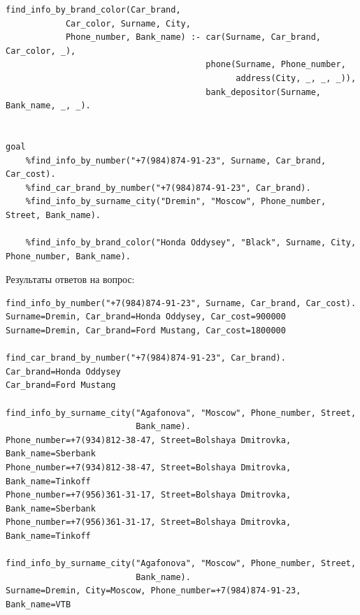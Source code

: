 \begin{lstlisting}[basicstyle=\footnotesize]
	find_info_by_brand_color(Car_brand, 
			Car_color, Surname, City, 
			Phone_number, Bank_name) :- car(Surname, Car_brand, Car_color, _),
										phone(Surname, Phone_number, 
											  address(City, _, _, _)), 
										bank_depositor(Surname, Bank_name, _, _).	 


goal
	%find_info_by_number("+7(984)874-91-23", Surname, Car_brand, Car_cost).
	%find_car_brand_by_number("+7(984)874-91-23", Car_brand).
	%find_info_by_surname_city("Dremin", "Moscow", Phone_number, Street, Bank_name).
	
	%find_info_by_brand_color("Honda Oddysey", "Black", Surname, City, Phone_number, Bank_name).  
\end{lstlisting}

Результаты ответов на вопрос:
\begin{lstlisting}[basicstyle=\footnotesize]
find_info_by_number("+7(984)874-91-23", Surname, Car_brand, Car_cost).	
Surname=Dremin, Car_brand=Honda Oddysey, Car_cost=900000
Surname=Dremin, Car_brand=Ford Mustang, Car_cost=1800000

find_car_brand_by_number("+7(984)874-91-23", Car_brand).
Car_brand=Honda Oddysey
Car_brand=Ford Mustang

find_info_by_surname_city("Agafonova", "Moscow", Phone_number, Street,
						  Bank_name).
Phone_number=+7(934)812-38-47, Street=Bolshaya Dmitrovka, Bank_name=Sberbank
Phone_number=+7(934)812-38-47, Street=Bolshaya Dmitrovka, Bank_name=Tinkoff
Phone_number=+7(956)361-31-17, Street=Bolshaya Dmitrovka, Bank_name=Sberbank
Phone_number=+7(956)361-31-17, Street=Bolshaya Dmitrovka, Bank_name=Tinkoff

find_info_by_surname_city("Agafonova", "Moscow", Phone_number, Street, 
						  Bank_name).
Surname=Dremin, City=Moscow, Phone_number=+7(984)874-91-23, Bank_name=VTB
\end{lstlisting} 

